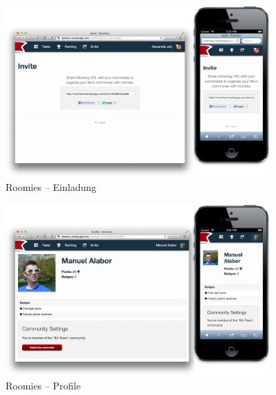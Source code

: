 \begin{figure}[H]
	\centering
	\includegraphics[width=0.9\textwidth]{content/appendix/roomies-screenshots/invite.png}
	\caption{Roomies -- Einladung}
	\label{fig:roomies-ss-invite}
\end{figure}

\begin{figure}[H]
	\centering
	\includegraphics[width=0.9\textwidth]{content/appendix/roomies-screenshots/profile.png}
	\caption{Roomies -- Profile}
	\label{fig:roomies-ss-profile}
\end{figure}
